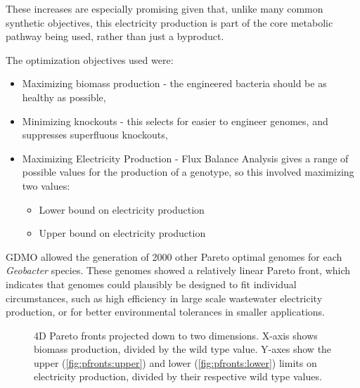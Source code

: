 \documentclass[a4paper]{article}
\begin{document}
These increases are especially promising given that, unlike many common synthetic objectives, this electricity production is part of the core metabolic pathway being used, rather than just a byproduct. 

The optimization objectives used were:
\begin{itemize}
	\item Maximizing biomass production - the engineered bacteria should be as healthy as possible,
	\item Minimizing knockouts - this selects for easier to engineer genomes, and suppresses superfluous knockouts,
	\item Maximizing Electricity Production - Flux Balance Analysis gives a range of possible values for the production of a genotype, so this involved maximizing two values:
	\begin{itemize}
		\item Lower bound on electricity production
		\item Upper bound on electricity production
	\end{itemize}
\end{itemize}

GDMO allowed the generation of 2000 other Pareto optimal genomes for each {\it Geobacter} species. These genomes showed a relatively linear Pareto front, which indicates that genomes could plausibly be designed to fit individual circumstances, such as high efficiency in large scale wastewater electricity production, or for better environmental tolerances in smaller applications.

\begin{figure}[!htb]
	\caption{4D Pareto fronts projected down to two dimensions. X-axis shows biomass production, divided by the wild type value. Y-axes show the upper (\ref{fig:pfronts:upper}) and lower (\ref{fig:pfronts:lower}) limits on electricity production, divided by their respective wild type values. \label{fig:pfronts}}
\end{figure}
\end{document}

